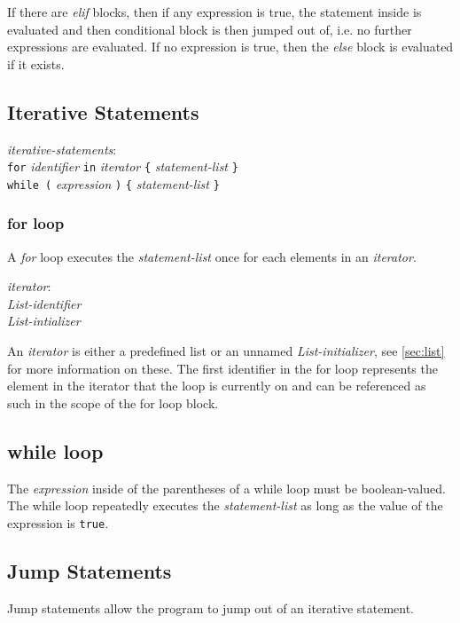\documentclass{article}
\begin{document}
If there are \emph{elif} blocks, then if any expression is true, the statement inside is evaluated and then conditional block is then jumped out of, i.e. no further expressions are evaluated. If no expression is true, then the \emph{else} block is evaluated if it exists.

\subsection{Iterative Statements}

\begin{tabbing}
	\= \emph{iter}\=\emph{ative-statements}: \\
	\> \> \texttt{for} \emph{identifier} \texttt{in} \emph{iterator} \texttt{\{} \emph{statement-list} \texttt{\}} \\
	\> \> \texttt{while (} \emph{expression} \texttt{)} \texttt{\{} \emph{statement-list} \texttt{\}}
\end{tabbing}

\subsubsection{for loop}

A \emph{for} loop executes the \emph{statement-list} once for each elements in an \emph{iterator}.

\begin{tabbing}
\= \emph{iter}\=\emph{ator}:\\
\>\> \emph{List-identifier} \\
\>\> \emph{List-intializer}
\end{tabbing}

An \emph{iterator} is either a predefined list or an unnamed \emph{List-initializer}, see \ref{sec:list} for more information on these. The first identifier in the for loop represents the element in the iterator that the loop is currently on and can be referenced as such in the scope of the for loop block.

\subsection{while loop}

The \emph{expression} inside of the parentheses of a while loop must be boolean-valued. The while loop repeatedly executes the \emph{statement-list} as long as the value of the expression is \texttt{true}.

\subsection{Jump Statements}
Jump statements allow the program to jump out of an iterative statement.
\end{document}
